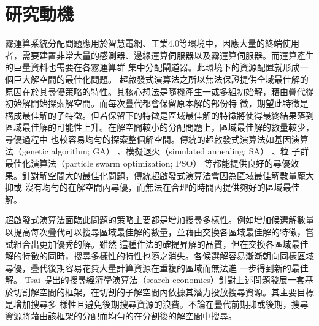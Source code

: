 \section{研究動機}
霧運算系統分配問題應用於智慧電網、工業4.0等環境中，因應大量的終端使用者，需要建置非常大量的感測器、邊緣運算伺服器以及霧運算伺服器。而運算產生的巨量資料也需要在各霧運算群
集中分配閘道器。此環境下的資源配置就形成一個巨大解空間的最佳化問題。
超啟發式演算法之所以無法保證提供全域最佳解的原因在於其尋優策略的特性。其核心想法是隨機產生一或多組初始解，藉由疊代從初始解開始探索解空間。而每次疊代都會保留原本解的部份特
徵，期望此特徵是構成最佳解的子特徵。但若保留下的特徵是區域最佳解的特徵將使得最終結果落到區域最佳解的可能性上升。在解空間較小的分配問題上，區域最佳解的數量較少，尋優過程中
也較容易均勻的探索整個解空間。傳統的超啟發式演算法如基因演算法（genetic algorithm; GA） \cite{holland_1962}、模擬退火（simulated annealing; SA） \cite{kirkpatrick_1983}、粒
子群最佳化演算法（particle swarm optimization; PSO） \cite{kennedy_1995}等都能提供良好的尋優效果。針對解空間大的最佳化問題，傳統超啟發式演算法會因為區域最佳解數量龐大抑或
沒有均勻的在解空間內尋優，而無法在合理的時間內提供夠好的區域最佳解。


超啟發式演算法面臨此問題的策略主要都是增加搜尋多樣性。例如增加候選解數量以提高每次疊代可以搜尋區域最佳解的數量，並藉由交換各區域最佳解的特徵，嘗試組合出更加優秀的解。雖然
這種作法的確提昇解的品質，但在交換各區域最佳解的特徵的同時，搜尋多樣性的特性也隨之消失。各候選解容易漸漸朝向同樣區域尋優，疊代後期容易花費大量計算資源在重複的區域而無法進
一步得到新的最佳解。
Tsai \cite{tsai_2015}提出的搜尋經濟學演算法（search economics）針對上述問題發展一套基於切割解空間的框架，在切割的子解空間內依據其潛力投放搜尋資源。其主要目標是增加搜尋多
樣性且避免後期搜尋資源的浪費。不論在疊代前期抑或後期，搜尋資源將藉由該框架的分配而均勻的在分割後的解空間中搜尋。
\\
\\
\\
